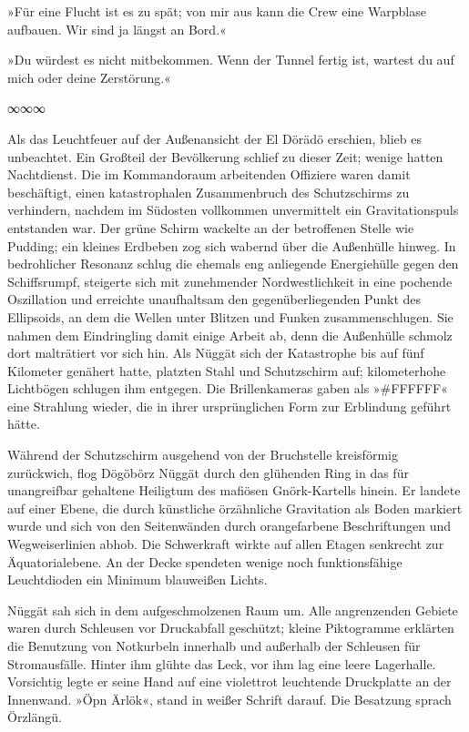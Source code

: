 
»Für eine Flucht ist es zu spät; von mir aus kann die Crew eine Warpblase aufbauen. Wir sind ja längst an Bord.«


»Du würdest es nicht mitbekommen. Wenn der Tunnel fertig ist, wartest du auf mich oder deine Zerstörung.«

\begin{center}
∞∞∞
\end{center}

Als das Leuchtfeuer auf der Außenansicht der El Dörädö erschien, blieb es unbeachtet. Ein Großteil der Bevölkerung schlief zu dieser Zeit; wenige hatten Nachtdienst. Die im Kommandoraum arbeitenden Offiziere waren damit beschäftigt, einen katastrophalen Zusammenbruch des Schutzschirms zu verhindern, nachdem im Südosten vollkommen unvermittelt ein Gravitationspuls entstanden war. Der grüne Schirm wackelte an der betroffenen Stelle wie Pudding; ein kleines Erdbeben zog sich wabernd über die Außenhülle hinweg. In bedrohlicher Resonanz schlug die ehemals eng anliegende Energiehülle gegen den Schiffsrumpf, steigerte sich mit zunehmender Nordwestlichkeit in eine pochende Oszillation und erreichte unaufhaltsam den gegenüberliegenden Punkt des Ellipsoids, an dem die Wellen unter Blitzen und Funken zusammenschlugen. Sie nahmen dem Eindringling damit einige Arbeit ab, denn die Außenhülle schmolz dort malträtiert vor sich hin. Als Nüggät sich der Katastrophe bis auf fünf Kilometer genähert hatte, platzten Stahl und Schutzschirm auf; kilometerhohe Lichtbögen schlugen ihm entgegen. Die Brillenkameras gaben als »\#FFFFFF« eine Strahlung wieder, die in ihrer ursprünglichen Form zur Erblindung geführt hätte.

Während der Schutzschirm ausgehend von der Bruchstelle kreisförmig zurückwich, flog Dögöbörz Nüggät durch den glühenden Ring in das für unangreifbar gehaltene Heiligtum des mafiösen Gnörk-Kartells hinein. Er landete auf einer Ebene, die durch künstliche örzähnliche Gravitation als Boden markiert wurde und sich von den Seitenwänden durch orangefarbene Beschriftungen und Wegweiserlinien abhob. Die Schwerkraft wirkte auf allen Etagen senkrecht zur Äquatorialebene. An der Decke spendeten wenige noch funktionsfähige Leuchtdioden ein Minimum blauweißen Lichts.

Nüggät sah sich in dem aufgeschmolzenen Raum um. Alle angrenzenden Gebiete waren durch Schleusen vor Druckabfall geschützt; kleine Piktogramme erklärten die Benutzung von Notkurbeln innerhalb und außerhalb der Schleusen für Stromausfälle. Hinter ihm glühte das Leck, vor ihm lag eine leere Lagerhalle. Vorsichtig legte er seine Hand auf eine violettrot leuchtende Druckplatte an der Innenwand. »Öpn Ärlök«, stand in weißer Schrift darauf. Die Besatzung sprach Örzlängü.

